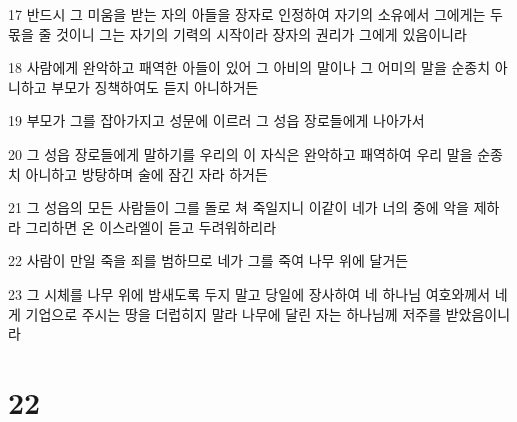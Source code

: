 \par 17 반드시 그 미움을 받는 자의 아들을 장자로 인정하여 자기의 소유에서 그에게는 두 몫을 줄 것이니 그는 자기의 기력의 시작이라 장자의 권리가 그에게 있음이니라
\par 18 사람에게 완악하고 패역한 아들이 있어 그 아비의 말이나 그 어미의 말을 순종치 아니하고 부모가 징책하여도 듣지 아니하거든
\par 19 부모가 그를 잡아가지고 성문에 이르러 그 성읍 장로들에게 나아가서
\par 20 그 성읍 장로들에게 말하기를 우리의 이 자식은 완악하고 패역하여 우리 말을 순종치 아니하고 방탕하며 술에 잠긴 자라 하거든
\par 21 그 성읍의 모든 사람들이 그를 돌로 쳐 죽일지니 이같이 네가 너의 중에 악을 제하라 그리하면 온 이스라엘이 듣고 두려워하리라
\par 22 사람이 만일 죽을 죄를 범하므로 네가 그를 죽여 나무 위에 달거든
\par 23 그 시체를 나무 위에 밤새도록 두지 말고 당일에 장사하여 네 하나님 여호와께서 네게 기업으로 주시는 땅을 더럽히지 말라 나무에 달린 자는 하나님께 저주를 받았음이니라

\chapter{22}

